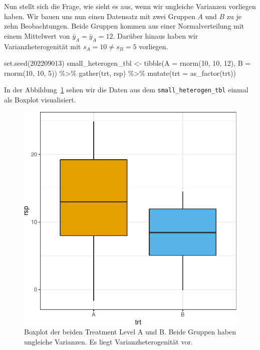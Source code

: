 \documentclass[
  letterpaper,
]{scrbook}
\newenvironment{Shaded}{\begin{snugshade}}{\end{snugshade}}
\newcommand{\AttributeTok}[1]{\textcolor[rgb]{0.40,0.45,0.13}{#1}}
\newcommand{\DecValTok}[1]{\textcolor[rgb]{0.68,0.00,0.00}{#1}}
\newcommand{\FunctionTok}[1]{\textcolor[rgb]{0.28,0.35,0.67}{#1}}
\newcommand{\NormalTok}[1]{\textcolor[rgb]{0.00,0.23,0.31}{#1}}
\newcommand{\OtherTok}[1]{\textcolor[rgb]{0.00,0.23,0.31}{#1}}
\newcommand{\SpecialCharTok}[1]{\textcolor[rgb]{0.37,0.37,0.37}{#1}}
\begin{document}
Nun stellt sich die Frage, wie sieht es aus, wenn wir ungleiche
Varianzen vorliegen haben. Wir bauen uns nun einen Datensatz mit zwei
Gruppen \(A\) und \(B\) zu je zehn Beobachtungen. Beide Gruppen kommen
aus einer Normalverteilung mit einem Mittelwert von
\(\bar{y}_A = \bar{y}_A = 12\). Darüber hinaus haben wir
Varianzheterogenität mit \(s_A = 10 \ne s_B = 5\) vorliegen.

\begin{Shaded}
\begin{Highlighting}[]
\FunctionTok{set.seed}\NormalTok{(}\DecValTok{202209013}\NormalTok{)}
\NormalTok{small\_heterogen\_tbl }\OtherTok{\textless{}{-}} \FunctionTok{tibble}\NormalTok{(}\AttributeTok{A =} \FunctionTok{rnorm}\NormalTok{(}\DecValTok{10}\NormalTok{, }\DecValTok{10}\NormalTok{, }\DecValTok{12}\NormalTok{),}
                              \AttributeTok{B =} \FunctionTok{rnorm}\NormalTok{(}\DecValTok{10}\NormalTok{, }\DecValTok{10}\NormalTok{, }\DecValTok{5}\NormalTok{)) }\SpecialCharTok{\%\textgreater{}\%} 
  \FunctionTok{gather}\NormalTok{(trt, rsp) }\SpecialCharTok{\%\textgreater{}\%} 
  \FunctionTok{mutate}\NormalTok{(}\AttributeTok{trt =} \FunctionTok{as\_factor}\NormalTok{(trt))}
\end{Highlighting}
\end{Shaded}

In der Abbildung~\ref{fig-vartest-2} sehen wir die Daten aus dem
\texttt{small\_heterogen\_tbl} einmal als Boxplot visualisiert.

\begin{figure}

{\centering \includegraphics{./stat-tests-pretest_files/figure-pdf/fig-vartest-2-1.pdf}

}

\caption{\label{fig-vartest-2}Boxplot der beiden Treatment Level A und
B. Beide Gruppen haben ungleiche Varianzen. Es liegt
Varianzheterogenität vor.}

\end{figure}
\end{document}
